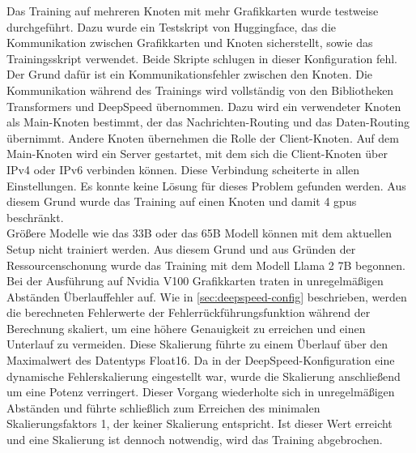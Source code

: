 Das Training auf mehreren Knoten mit mehr Grafikkarten wurde testweise durchgeführt.
Dazu wurde ein Testskript von Huggingface, das die Kommunikation zwischen Grafikkarten und Knoten sicherstellt, sowie das Trainingsskript verwendet.
Beide Skripte schlugen in dieser Konfiguration fehl.
Der Grund dafür ist ein Kommunikationsfehler zwischen den Knoten.
Die Kommunikation während des Trainings wird vollständig von den Bibliotheken Transformers und DeepSpeed übernommen.
Dazu wird ein verwendeter Knoten als Main-Knoten bestimmt, der das Nachrichten-Routing und das Daten-Routing übernimmt.
Andere Knoten übernehmen die Rolle der Client-Knoten.
Auf dem Main-Knoten wird ein Server gestartet, mit dem sich die Client-Knoten über IPv4 oder IPv6 verbinden können.
Diese Verbindung scheiterte in allen Einstellungen.
Es konnte keine Lösung für dieses Problem gefunden werden.
Aus diesem Grund wurde das Training auf einen Knoten und damit 4 \ac{gpu}s beschränkt.\\

Größere Modelle wie das 33B oder das 65B Modell können mit dem aktuellen Setup nicht trainiert werden.
Aus diesem Grund und aus Gründen der Ressourcenschonung wurde das Training mit dem Modell Llama 2 7B begonnen.
Bei der Ausführung auf Nvidia V100 Grafikkarten traten in unregelmäßigen Abständen Überlauffehler auf.
Wie in \cref{sec:deepspeed-config} beschrieben, werden die berechneten Fehlerwerte der Fehlerrückführungsfunktion während der Berechnung skaliert, um eine höhere Genauigkeit zu erreichen und einen Unterlauf zu vermeiden.
Diese Skalierung führte zu einem Überlauf über den Maximalwert des Datentyps Float16.
Da in der DeepSpeed-Konfiguration eine dynamische Fehlerskalierung eingestellt war, wurde die Skalierung anschließend um eine Potenz verringert.
Dieser Vorgang wiederholte sich in unregelmäßigen Abständen und führte schließlich zum Erreichen des minimalen Skalierungsfaktors 1, der keiner Skalierung entspricht.
Ist dieser Wert erreicht und eine Skalierung ist dennoch notwendig, wird das Training abgebrochen.\\

